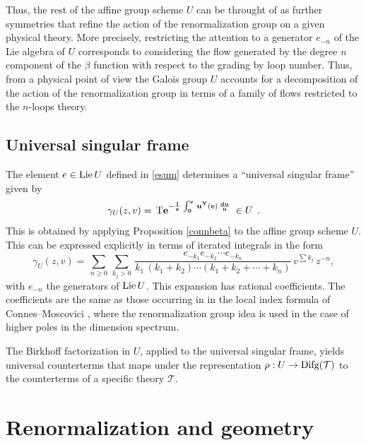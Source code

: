 \documentclass[10pt]{amsart}
\def\sT{{\mathcal T}}
\def\g{\gamma}
\def\Lie{{\rm Lie}}
\numberwithin{equation}{section}
\begin{document}
\smallskip

Thus, the rest of the affine group scheme $U$ can be throught of
as further symmetries that refine the action of the
renormalization group on a given physical theory. More precisely,
restricting the attention to a generator $e_{-n}$ of the Lie
algebra of $U$ corresponds to considering the flow generated by
the degree $n$ component of the $\beta$ function with respect to
the grading by loop number. Thus, from a physical point of view
the Galois group $U$ accounts for a decomposition of the action of
the renormalization group in terms of a family of flows restricted
to the $n$-loops theory.

\medskip
\subsection*{Universal singular frame}\hfill\medskip

The element $e\in \Lie\,U$ defined in \eqref{esum} determines a
``universal singular frame'' given by
\begin{equation}\label{univ}
\g_U(z,v) =\,{\bf {\rm T}e^{-\frac{1}{z}\,
 \int^{v}_0\,u^Y(e)\,\frac{du}{u}}}\;
\in U\;
  \,.
\end{equation}
This is obtained by applying Proposition \ref{connbeta} to the
affine group scheme $U$. This can be expressed explicitly in terms
of iterated integrals in the form
\begin{equation}\label{framecoeff}
\g_U(z,v) =\,\sum_{n \geq
0}\,\sum_{k_j>0}\,\frac{e_{-k_1}e_{-k_2}\cdots e_{-k_n}}
{k_1\,(k_1+k_2)\cdots (k_1+k_2+\cdots +k_n)}\,v^{\sum
k_j}\,z^{-n},
\end{equation}
with $e_{-n}$ the generators of $\Lie \,U$. This expansion has
rational coefficients. The coefficients are the same as those
occurring in in the local index formula of Connes--Moscovici
\cite{cmindex}, where the renormalization group idea is used in
the case of higher poles in the dimension spectrum.

\smallskip

The Birkhoff factorization in $U$, applied to the universal singular
frame, yields universal counterterms that maps under the
representation $\rho: U \to {\rm Difg}(\sT)$ to the counterterms of a
specific theory $\sT$.


\section{Renormalization and geometry}
\end{document}
